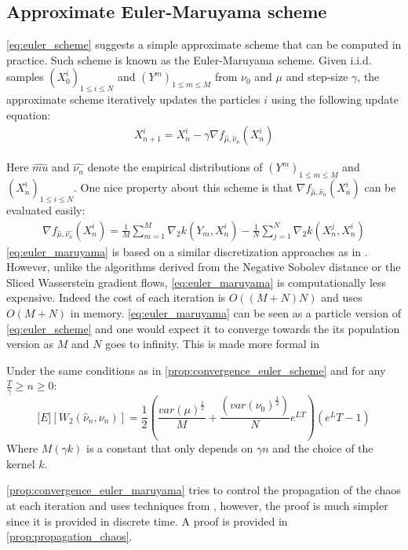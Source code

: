 \subsection{Approximate Euler-Maruyama scheme}\label{subsec:euler_maruyama}
\cref{eq:euler_scheme} suggests a simple approximate scheme that can be computed in practice. Such scheme is known as the Euler-Maruyama scheme.
Given i.i.d. samples $(X^i_0)_{1\leq i\leq N}$ and $(Y^{m})_{1\leq m\leq M}$ from $\nu_0$ and $\mu$ and step-size $\gamma$, the approximate scheme iteratively updates the particles $i$ using the following update equation: 
\begin{align}\label{eq:euler_maruyama}
X_{n+1}^{i} = X_n^i -\gamma \nabla f_{\hat{\mu},\hat{\nu}_n}(X_n^i)
\end{align}

Here $\hat{mu}$ and $\hat{\nu_n}$ denote the empirical distributions of $(Y^{m})_{1\leq m\leq M}$ and $(X^i_n)_{1\leq i\leq N}$. One nice property about this scheme is that $\nabla f_{\hat{\mu},\hat{\nu}_n}(X_n^i)$ can be evaluated easily:
\begin{align}
\nabla f_{\hat{\mu},\hat{\nu_n}}(X_n^i) = \frac{1}{M}\sum_{m=1}^M \nabla_2 k(Y_m,X_n^i)-\frac{1}{N}\sum_{j=1}^N \nabla_2 k(X_n^j,X_n^i)
\end{align}
\cref{eq:euler_maruyama} is based on a similar discretization approaches as in \cite{Mroueh:2019,Simsekli:2018}. However, unlike the algorithms derived from the Negative Sobolev distance or the Sliced Wasserstein gradient flows, \cref{eq:euler_maruyama} is computationally less expensive. Indeed the cost of each iteration is $O((M+N)N)$ and uses $O(M+N)$ in memory.
\cref{eq:euler_maruyama} can be seen as a particle version of \cref{eq:euler_scheme} and one would expect it to converge towards the its population version as $M$ and $N$ goes to infinity. This is made more formal in 
\begin{theorem}\label{prop:convergence_euler_maruyama}
	Under the same conditions as in \cref{prop:convergence_euler_scheme} and for any $\frac{T}{\gamma}\geq n\geq 0$:
	\begin{equation}
	\mathbb[E][W_2(\hat{\nu}_n,\nu_n)] = \frac{1}{2}(\frac{var(\mu)^\frac{1}{2}}{M} + \frac{(var(\nu_0)^\frac{1}{2})}{N}e^{LT})(e^LT-1)
	\end{equation}
	Where $M(\gamma k)$ is a constant that only depends on $\gamma n$ and the choice of the kernel $k$.
\end{theorem}
\cref{prop:convergence_euler_maruyama} tries to control the propagation of the chaos at each iteration and uses techniques from \cite{Jourdain:2007}, however, the proof is much simpler since it is provided in discrete time. A proof is provided in \cref{prop:propagation_chaos}.
